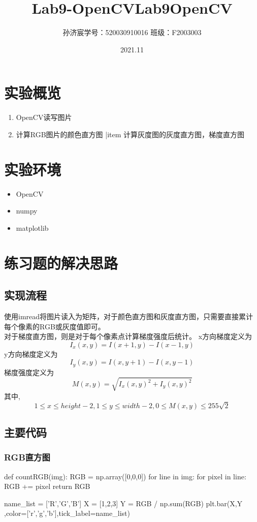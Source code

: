 \documentclass[12pt,a4paper]{article}
\title{Lab9-OpenCV}
\title{Lab9\quad OpenCV}
\date{2021.11}
\author{孙济宸\quad \quad 学号：520030910016 \quad  \quad 班级：F2003003}
\begin{document}
\maketitle
\section{实验概览}
\begin{enumerate}
\item OpenCV读写图片
\item 计算RGB图片的颜色直方图
|item 计算灰度图的灰度直方图，梯度直方图
\end{enumerate}
\section{实验环境}
\begin{itemize}
	\item OpenCV
	\item numpy
	\item matplotlib

\end{itemize}
\newpage

\section{练习题的解决思路}
\subsection{实现流程}
使用imread将图片读入为矩阵，对于颜色直方图和灰度直方图，只需要直接累计每个像素的RGB或灰度值即可。\\
对于梯度直方图，则是对于每个像素点计算梯度强度后统计。
x方向梯度定义为
$$I_x(x,y)=I(x+1,y)-I(x-1,y)$$
y方向梯度定义为
$$I_y(x,y)=I(x,y+1)-I(x,y-1)$$
梯度强度定义为
$$M(x,y)=\sqrt{I_x(x,y)^2+I_y(x,y)^2}$$
其中,
$$1 \leq x \leq height - 2, 1 \leq y \leq width - 2, 0 \leq M(x,y) \leq 255\sqrt{2}$$

\subsection{主要代码}
\subsubsection{RGB直方图}
\begin{python}
def countRGB(img):
    RGB = np.array([0,0,0])
    for line in img:
        for pixel in line:
            RGB += pixel
    return RGB
    
name_list = ['R','G','B']
X = [1,2,3]
Y = RGB / np.sum(RGB)
plt.bar(X,Y ,color=['r','g','b'],tick_label=name_list)
\end{python}
\end{document}
